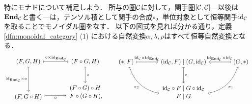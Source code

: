 \documentclass[uplatex,a4paper,dvipdfmx]{jsarticle}
\begin{document}
特にモナドについて補足しよう．
所与の圏${\mathcal{C}}$に対して，関手圏$[{\mathcal{C}}, {\mathcal{C}}]$---以後は${\mathord{\mathbf{End}}}_{\mathcal{C}}$と書く---は，テンソル積として関手の合成$\circ$，単位対象として恒等関手$\mathrm{id}_{\mathcal{C}}$を取ることでモノイダル圏をなす．
以下の図式を見れば分かる通り，定義\ref{dfn:monoidal_category} (1) における自然変換$\alpha, \lambda, \rho$はすべて恒等自然変換となる．
\begin{equation*}
    \begin{tikzcd}[sep=large]
        (F, G, H) \arrow[r, mapsto, "\circ \times \id_{\End_\Ccal}"] \arrow[d, mapsto, "\id_{\End_\Ccal} \times \circ"'] & (F \circ G, H) \arrow[d, mapsto, "\circ"] \\
        (F, G \circ H) \arrow[r, mapsto, "\circ"', end anchor={[yshift=-2.9pt]}] & |[yshift=8pt]| \genfrac{}{}{0pt}{0}{(F \circ G) \circ H}{F \circ (G \circ H)\rlap{,}}
    \end{tikzcd}
    \qquad
    \begin{tikzcd}[sep=large]
        (*, F) \arrow[r, mapsto, "\id_\Ccal \times \id_{\End_\Ccal}"] \arrow[rd, mapsto, bend right, "\pi_2"' name=X]
                        & (\id_\Ccal, F) \mid (G, \id_\Ccal) \arrow[d, mapsto, "\circ"] %
                        & \arrow[l, mapsto, "\id_{\End_\Ccal} \times \id_\Ccal"'] (G, *) \arrow[ld, mapsto, bend left, "\pi_1" name=Y] \\ %
                        & \genfrac{}{}{0pt}{0}{\id_\Ccal \circ F \mid G \circ \id_\Ccal}{F \mid G\rlap{.}}
    \end{tikzcd}
\end{equation*}
\end{document}

